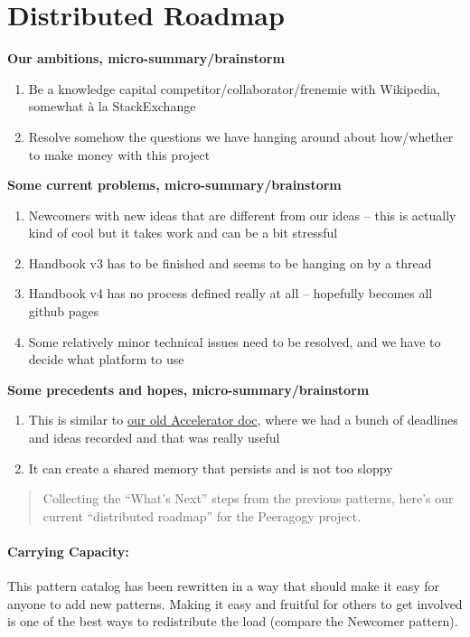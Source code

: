 \section{Distributed Roadmap}

\textbf{Our ambitions, micro-summary/brainstorm}
\begin{enumerate}
\item Be a knowledge capital competitor/collaborator/frenemie with Wikipedia, somewhat \`a la StackExchange
\item Resolve somehow the questions we have hanging around about how/whether to make money with this project 
\end{enumerate}

\textbf{Some current problems, micro-summary/brainstorm}
\begin{enumerate}
\item Newcomers with new ideas that are different from our ideas -- this is actually kind of cool but it takes work and can be a bit stressful
\item Handbook v3 has to be finished and seems to be hanging on by a thread
\item Handbook v4 has no process defined really at all -- hopefully becomes all github pages
\item Some relatively minor technical issues need to be resolved, and we have to decide what platform to use
\end{enumerate}

\textbf{Some precedents and hopes, micro-summary/brainstorm}
\begin{enumerate}
\item This is similar to \href{https://docs.google.com/document/d/1RZEsqFDwF-jPiCvgWzJgi6n6faTRTDuPQS1CMEeXxRE/edit#heading=h.p197njr3jsn8}{our old Accelerator doc}, where we had a bunch of deadlines and ideas recorded and that was really useful 
\item It can create a shared memory that persists and is not too sloppy
\end{enumerate}

\begin{quote}
Collecting the ``What's Next'' steps from the previous patterns, here's
our current ``distributed roadmap'' for the Peeragogy project.
\end{quote}

\paragraph{Carrying Capacity:} This pattern catalog has been rewritten in a way that should make it
easy for anyone to add new patterns. Making it easy and fruitful for
others to get involved is one of the best ways to redistribute the load
(compare the Newcomer pattern).

